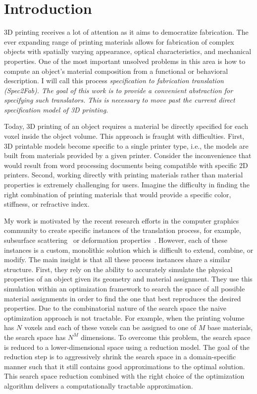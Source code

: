 
%
\chapter{Introduction}
\label{chap:intro}
%
3D printing receives a lot of attention as it aims to democratize fabrication.
The ever expanding range of printing materials allows for fabrication of complex objects with spatially varying appearance, optical characteristics, and mechanical properties.
One of the most important unsolved problems in this area is how to compute an object's material composition from a functional or behavioral description. I will call this process \em specification to fabrication translation (Spec2Fab). 
The goal of this work is to provide a convenient abstraction for specifying such translators. This is necessary to move past the current direct specification model of 3D printing.

Today,  3D printing of an object requires a material be directly specified for each voxel inside the object volume. This approach is fraught with difficulties. First, 3D printable models become specific to a single printer type, i.e., the models are built from materials provided by a given printer. Consider the inconvenience that would result from  word processing documents being compatible with specific 2D printers. Second, working directly with printing materials rather than material properties is extremely challenging for users. Imagine the difficulty in finding the right combination of printing materials that would provide a specific color, stiffness, or refractive index.

My work is motivated by the recent research efforts in the computer graphics community to create specific instances of the translation process, for example, subsurface scattering~\cite{Hasan:2010:PRO,Dong:2010:FSS} or deformation properties~\cite{Bickel:2010:DAF}. However, each of these instances is a custom, monolithic solution which is difficult to extend, combine, or modify. The main insight is that all these process instances share a similar structure. First, they rely on the ability to accurately simulate the physical properties of an object given its geometry and material assignment. They use this simulation within an optimization framework to search the space of all possible material assignments in order to find the one that best reproduces the desired properties. Due to the combinatorial nature of the search space the naive optimization approach is not tractable. For example, when the printing volume has $N$ voxels and each of these voxels can be assigned to one of $M$ base materials, the search space has $N^M$ dimensions. To overcome this problem, the search space is reduced to a lower-dimensional space using a reduction model. The goal of the reduction step is to aggressively shrink the search space in a domain-specific manner such that it still contains good approximations to the optimal solution. This search space reduction combined with the right choice of the optimization algorithm delivers a computationally tractable approximation.

